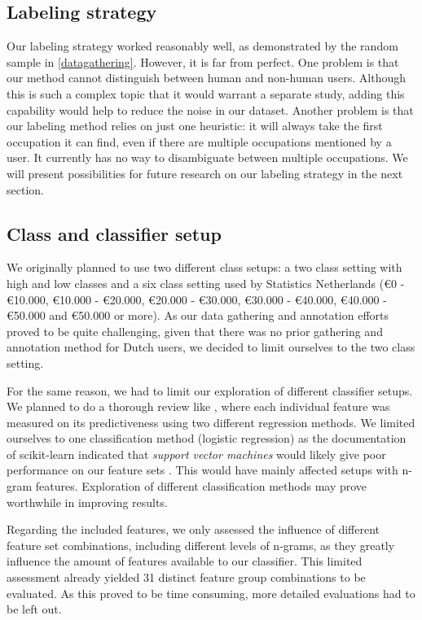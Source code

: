 \documentclass[
10pt, %
a4paper, %
oneside, %
headinclude,footinclude, %
] {book}%
\begin{document}
\subsection{Labeling strategy}
Our labeling strategy worked reasonably well, as demonstrated by the random sample in \autoref{datagathering}. However, it is far from perfect. One problem is that our method cannot distinguish between human and non-human users. Although this is such a complex topic that it would warrant a separate study, adding this capability would help to reduce the noise in our dataset. Another problem is that our labeling method relies on just one heuristic: it will always take the first occupation it can find, even if there are multiple occupations mentioned by a user. It currently has no way to disambiguate between multiple occupations. We will present possibilities for future research on our labeling strategy in the next section.

\subsection{Class and classifier setup}
We originally planned to use two different class setups: a two class setting with high and low classes and a six class setting used by Statistics Netherlands (\euro 0 - \euro 10.000, \euro 10.000 - \euro 20.000, \euro 20.000 - \euro 30.000, \euro 30.000 - \euro 40.000, \euro 40.000 - \euro 50.000 and \euro 50.000 or more). As our data gathering and annotation efforts proved to be quite challenging, given that there was no prior gathering and annotation method for Dutch users, we decided to limit ourselves to the two class setting.

For the same reason, we had to limit our exploration of different classifier setups. We planned to do a thorough review like \citet{flekova}, where each individual feature was measured on its predictiveness using two different regression methods. We limited ourselves to one classification method (logistic regression) as the documentation of scikit-learn indicated that \textit{support vector machines} would likely give poor performance on our feature sets \citep{svm}. This would have mainly affected setups with n-gram features. Exploration of different classification methods may prove worthwhile in improving results.

Regarding the included features, we only assessed the influence of different feature set combinations, including different levels of n-grams, as they greatly influence the amount of features available to our classifier. This limited assessment already yielded 31 distinct feature group combinations to be evaluated. As this proved to be time consuming, more detailed evaluations had to be left out.
\end{document}
